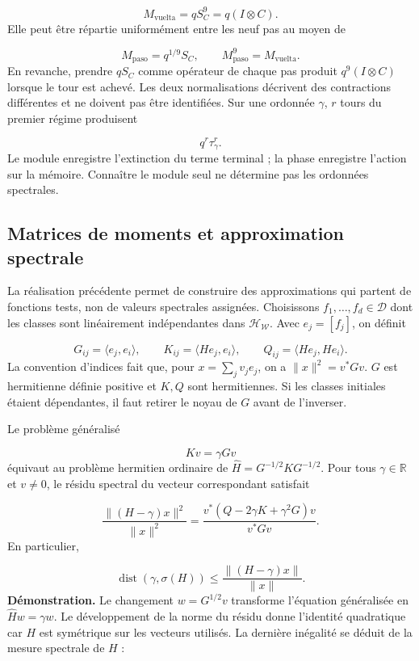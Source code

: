 \[
M_{\mathrm{vuelta}}=qS_C^9
=q(I\otimes C).
\]
Elle peut être répartie uniformément entre les neuf pas au moyen de

\[
M_{\mathrm{paso}}=q^{1/9}S_C,\qquad
M_{\mathrm{paso}}^9=M_{\mathrm{vuelta}}.
\]
En revanche, prendre \(qS_C\) comme opérateur de chaque pas produit \(q^9(I\otimes C)\) lorsque le tour est achevé. Les deux normalisations décrivent des contractions différentes et ne doivent pas être identifiées. Sur une ordonnée \(\gamma\), \(r\) tours du premier régime produisent

\[
q^r\tau_\gamma^r.
\]
Le module enregistre l'extinction du terme terminal ; la phase enregistre l'action sur la mémoire. Connaître le module seul ne détermine pas les ordonnées spectrales.

\subsection{Matrices de moments et approximation spectrale}
\label{viii:rz:galerkin}
La réalisation précédente permet de construire des approximations qui partent de fonctions tests, non de valeurs spectrales assignées. Choisissons \(f_1,\ldots,f_d\in\mathcal D\) dont les classes sont linéairement indépendantes dans \(\mathcal H_{\mathscr W}\). Avec \(e_j=[f_j]\), on définit

\[
G_{ij}=\langle e_j,e_i\rangle,\qquad
K_{ij}=\langle He_j,e_i\rangle,\qquad
Q_{ij}=\langle He_j,He_i\rangle.
\]
La convention d'indices fait que, pour \(x=\sum_jv_je_j\), on a \(\|x\|^2=v^*Gv\). \(G\) est hermitienne définie positive et \(K,Q\) sont hermitiennes. Si les classes initiales étaient dépendantes, il faut retirer le noyau de \(G\) avant de l'inverser.

Le problème généralisé

\[
Kv=\gamma Gv
\]
équivaut au problème hermitien ordinaire de \(\widehat H=G^{-1/2}KG^{-1/2}\). Pour tous \(\gamma\in\mathbb R\) et \(v\neq0\), le résidu spectral du vecteur correspondant satisfait

\[
\frac{\|(H-\gamma)x\|^2}{\|x\|^2}
=\frac{v^*(Q-2\gamma K+\gamma^2G)v}{v^*Gv}.
\]
En particulier,

\[
\operatorname{dist}(\gamma,\sigma(H))
\leq\frac{\|(H-\gamma)x\|}{\|x\|}.
\]
\textbf{Démonstration.} Le changement \(w=G^{1/2}v\) transforme l’équation généralisée en \(\widehat Hw=\gamma w\). Le développement de la norme du résidu donne l’identité quadratique car \(H\) est symétrique sur les vecteurs utilisés. La dernière inégalité se déduit de la mesure spectrale de \(H\) :

